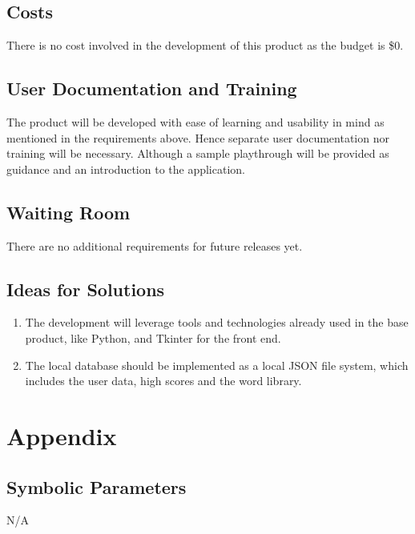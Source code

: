 \documentclass[12pt, titlepage]{article}
\begin{document}
\subsection{Costs}

There is no cost involved in the development of this product as the budget is \$0.

\subsection{User Documentation and Training}

The product will be developed with ease of learning and usability in mind as mentioned in the requirements above. Hence separate user documentation nor training will be necessary. Although a sample playthrough will be provided as guidance and an introduction to the application.

\subsection{Waiting Room}

There are no additional requirements for future releases yet.

\subsection{Ideas for Solutions}

\begin{enumerate}
	\item The development will leverage tools and technologies already used in the base product, like Python, and Tkinter for the front end.	
	\item The local database should be implemented as a local JSON file system, which includes the user data, high scores and the word library. 
\end{enumerate}

\section{Appendix}

\subsection{Symbolic Parameters}

N/A

\newpage





\newpage
\end{document}
